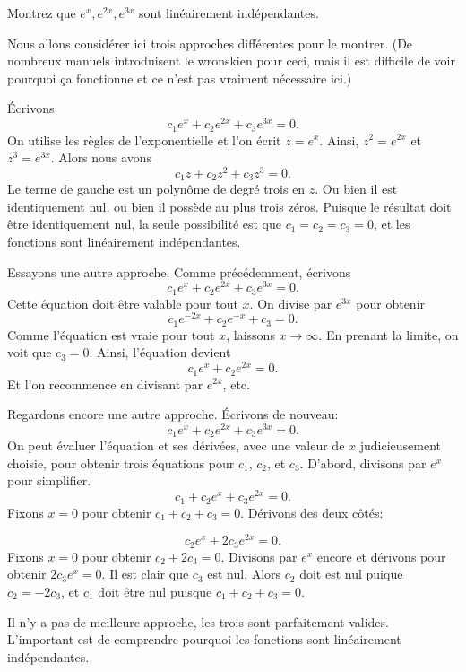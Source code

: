 \begin{example}
Montrez que $e^x, e^{2x}, e^{3x}$ sont linéairement indépendantes.

Nous allons considérer ici trois approches différentes pour le montrer.
(De nombreux manuels introduisent le wronskien pour ceci, mais il est difficile de voir pourquoi ça fonctionne et
ce n'est pas vraiment nécessaire ici.)

Écrivons
\begin{equation*}
c_1 e^x + c_2 e^{2x} + c_3 e^{3x} = 0.
\end{equation*}
On utilise les règles de l'exponentielle et l'on écrit $z = e^x$.  Ainsi, $z^2 = e^{2x}$
et $z^3 = e^{3x}$.  Alors nous avons
\begin{equation*}
c_1 z + c_2 z^2 + c_3 z^3 = 0.
\end{equation*}
Le terme de gauche est un polynôme de degré trois en $z$.
Ou bien il est identiquement nul, ou bien il possède au plus trois zéros. Puisque le résultat doit être identiquement nul, la seule possibilité est que 
$c_1 = c_2 = c_3 = 0$, et les fonctions sont linéairement indépendantes. 

Essayons une autre approche. Comme précédemment, écrivons 
\begin{equation*}
c_1 e^x + c_2 e^{2x} + c_3 e^{3x} = 0.
\end{equation*}
Cette équation doit être valable pour tout $x$.  On divise par  $e^{3x}$ pour obtenir
\begin{equation*}
c_1 e^{-2x} + c_2 e^{-x} + c_3 = 0.
\end{equation*}
Comme l'équation est vraie pour tout $x$, laissons $x \to \infty$.  En prenant la limite, on voit que $c_3 = 0$.  Ainsi, l'équation devient 
\begin{equation*}
c_1 e^x + c_2 e^{2x} = 0.
\end{equation*}
Et l'on recommence en divisant par $e^{2x}$, etc.

Regardons encore une autre approche. Écrivons de nouveau:  
\begin{equation*}
c_1 e^x + c_2 e^{2x} + c_3 e^{3x} = 0.
\end{equation*}
On peut évaluer l'équation et ses dérivées, avec une valeur de $x$ judicieusement choisie, pour obtenir trois équations pour 
$c_1$, $c_2$, et $c_3$.
D'abord, divisons par $e^{x}$ pour simplifier.
\begin{equation*}
c_1 + c_2 e^{x} + c_3 e^{2x} = 0.
\end{equation*}
Fixons $x=0$ pour obtenir $c_1 + c_2 + c_3 = 0$.  Dérivons des deux côtés: 

\begin{equation*}
c_2 e^{x} + 2 c_3 e^{2x} = 0 .
\end{equation*}
Fixons  $x=0$ pour obtenir $c_2 + 2c_3 = 0$.  Divisons par $e^x$ encore et dérivons pour obtenir 
$2 c_3 e^{x} = 0$.  Il est clair que   $c_3$ est nul.  Alors $c_2$ doit est nul puique $c_2 = -2c_3$, et $c_1$ doit être nul puisque $c_1 + c_2 + c_3 = 0$.

Il n'y a pas de meilleure approche, les trois sont parfaitement valides. L'important est de comprendre pourquoi les fonctions sont linéairement indépendantes. 
\end{example}

